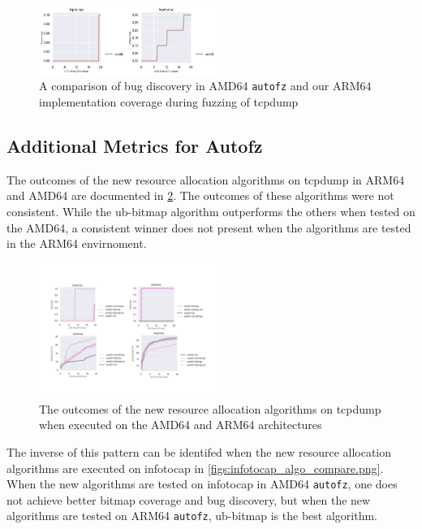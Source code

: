 \begin{figure}
    \includegraphics[width=0.52\textwidth]{figs/tcpdump_compare_orig_arm64_ub.png}
    \centering
    \caption{A comparison of bug discovery in AMD64 \texttt{autofz} and our ARM64 implementation
    coverage during fuzzing of tcpdump}
    \label{figs:tcp_compare_orig_arm64_ub.png}
\end{figure}

\subsection{Additional Metrics for Autofz}

The outcomes of the new resource allocation algorithms on tcpdump in ARM64 and AMD64 are documented in \ref{figs:tcpdump_algo_compare.png}. 
The outcomes of these algorithms were not consistent. While the ub-bitmap algorithm outperforms the others when tested on the AMD64, a 
consistent winner does not present when the algorithms are tested in the ARM64 envirnoment. 

\begin{figure}
    \includegraphics[width=0.52\textwidth]{figs/tcpdump_algo_compare.png}
    \centering
    \caption{The outcomes of the new resource allocation algorithms on tcpdump when executed on the AMD64 and ARM64 architectures}
    \label{figs:tcpdump_algo_compare.png}
\end{figure}

The inverse of this pattern can be identifed when the new resource allocation algorithms are executed on infotocap in 
\ref{figs:infotocap_algo_compare.png}. When the new algorithms are tested on infotocap in AMD64 \texttt{autofz}, one does not achieve better
bitmap coverage and bug discovery, but when the new algorithms are tested on ARM64 \texttt{autofz}, ub-bitmap is the best algorithm.

